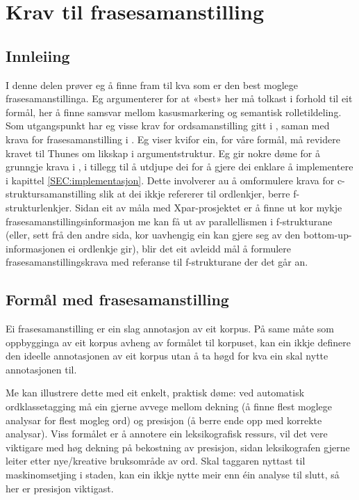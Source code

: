 \documentclass[11pt,a4paper,oneside,draft]{book}
\begin{document}
\chapter{Krav til frasesamanstilling}
\label{sec-3}

\label{SEC:ideell}

\section{Innleiing}
\label{sec-3.1}

I denne delen prøver eg å finne fram til kva som er den best moglege
frasesamanstillinga. Eg argumenterer for at «best» her må tolkast i
forhold til eit formål, her å finne samsvar mellom kasusmarkering og
semantisk rolletildeling. Som utgangspunkt har eg visse krav for
ordsamanstilling gitt i \citet{thunes2003eal}, saman med krava for
frasesamanstilling i \citet{dyvik2009lmp}. Eg viser kvifor ein, for
våre formål, må revidere kravet til Thunes om likskap i
argumentstruktur. Eg gir nokre døme for å grunngje krava i
\citet{dyvik2009lmp}, i tillegg til å utdjupe dei for å gjere dei
enklare å implementere i kapittel \ref{SEC:implementasjon}. Dette
involverer au å omformulere krava for c-struktursamanstilling slik at
dei ikkje refererer til ordlenkjer, berre f-strukturlenkjer. Sidan eit
av måla med Xpar-prosjektet er å finne ut kor mykje
frasesamanstillingsinformasjon me kan få ut av parallellismen i
f-strukturane (eller, sett frå den andre sida, kor uavhengig ein kan
gjere seg av den bottom-up-informasjonen ei ordlenkje gir), blir det
eit avleidd mål å formulere frasesamanstillingskrava med referanse til
f-strukturane der det går an.

\section{Formål med frasesamanstilling}
\label{sec-3.2}

Ei frasesamanstilling er ein slag annotasjon av eit korpus. På same
måte som oppbygginga av eit korpus avheng av formålet til korpuset,
kan ein ikkje definere den ideelle annotasjonen av eit korpus utan å
ta høgd for kva ein skal nytte annotasjonen til.

Me kan illustrere dette med eit enkelt, praktisk døme: ved automatisk
ordklassetagging må ein gjerne avvege mellom dekning (å finne flest
moglege analysar for flest mogleg ord) og presisjon (å berre ende opp
med korrekte analysar).  Viss formålet er å annotere ein
leksikografisk ressurs, vil det vere viktigare med høg dekning på
bekostning av presisjon, sidan leksikografen gjerne leiter etter
nye/kreative bruksområde av ord. Skal taggaren nyttast til
maskinomsetjing i staden, kan ein ikkje nytte meir enn éin analyse til
slutt, så her er presisjon viktigast.
\end{document}
